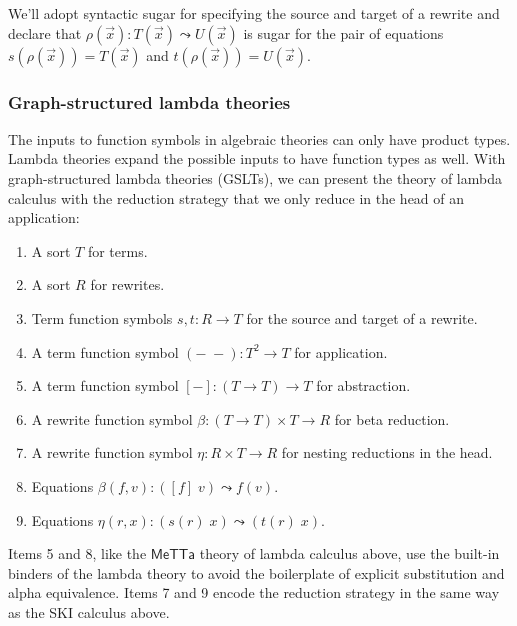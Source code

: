 \documentclass{article}
\begin{document}
We'll adopt syntactic sugar for specifying the source and target of a rewrite and declare that $\rho(\vec{x})\colon T(\vec{x}) \leadsto U(\vec{x})$ is sugar for the pair of equations $s(\rho(\vec{x})) = T(\vec{x})$ and $t(\rho(\vec{x})) = U(\vec{x}).$

\subsubsection{Graph-structured lambda theories}

The inputs to function symbols in algebraic theories can only have product types.  Lambda theories expand the possible inputs to have function types as well.  With graph-structured lambda theories (GSLTs), we can present the theory of lambda calculus with the reduction strategy that we only reduce in the head of an application:
\begin{enumerate}
    \item A sort $T$ for terms.
    \item A sort $R$ for rewrites.
    \item Term function symbols $s, t\colon R \to T$ for the source and target of a rewrite.
    \item A term function symbol $(-\; -)\colon T^2 \to T$ for application.
    \item A term function symbol $[-]\colon (T \to T) \to T$ for abstraction.
    \item A rewrite function symbol $\beta\colon (T \to T) \times T \to R$ for beta reduction.
    \item A rewrite function symbol $\eta\colon R \times T \to R$ for nesting reductions in the head.
    \item Equations $\beta(f, v)\colon ([f]\; v) \leadsto f(v).$
    \item Equations $\eta(r, x)\colon (s(r)\; x) \leadsto (t(r)\; x).$
\end{enumerate}
Items 5 and 8, like the $\mathsf{MeTTa}$ theory of lambda calculus above, use the built-in binders of the lambda theory to avoid the boilerplate of explicit substitution and alpha equivalence.  Items 7 and 9 encode the reduction strategy in the same way as the SKI calculus above.
\end{document}
